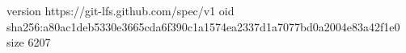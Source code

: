 version https://git-lfs.github.com/spec/v1
oid sha256:a80ac1deb5330e3665cda6f390c1a1574ea2337d1a7077bd0a2004e83a42f1e0
size 6207

